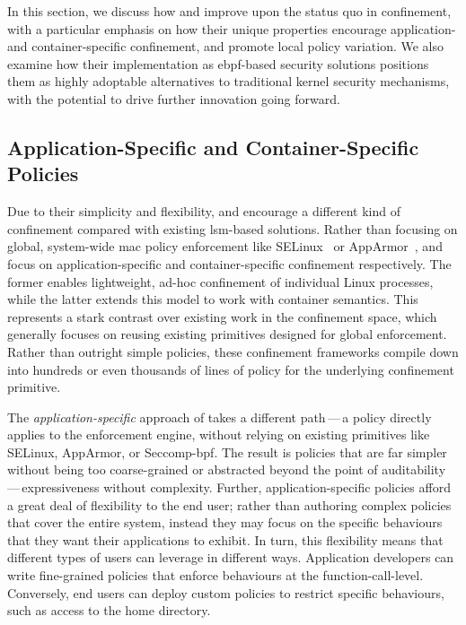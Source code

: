In this section, we discuss how \bpfbox{} and \bpfcontain{} improve upon the status quo in
confinement, with a particular emphasis on how their unique properties encourage
application- and container-specific confinement, and promote local policy variation. We
also examine how their implementation as \gls{ebpf}-based security solutions positions
them as highly adoptable alternatives to traditional kernel security mechanisms, with the
potential to drive further innovation going forward.

\subsection{Application-Specific and Container-Specific Policies}

Due to their simplicity and flexibility, \bpfbox{} and \bpfcontain{} encourage a different
kind of confinement compared with existing \gls{lsm}-based solutions. Rather than focusing
on global, system-wide \gls{mac} policy enforcement like
SELinux~\cite{smalley2001_selinux} or AppArmor~\cite{cowan2000_apparmor}, \bpfbox{} and
\bpfcontain{} focus on application-specific and container-specific confinement
respectively. The former enables lightweight, ad-hoc confinement of individual Linux
processes, while the latter extends this model to work with container semantics.  This
represents a stark contrast over existing work in the confinement space, which generally
focuses on reusing existing primitives designed for global enforcement.  Rather than
outright simple policies, these confinement frameworks compile down into hundreds or even
thousands of lines of policy for the underlying confinement primitive.

The \textit{application-specific} approach of \bpfbox{} takes a different path\,---\,a
\bpfbox{} policy directly applies to the \bpfbox{} enforcement engine, without relying on
existing primitives like SELinux, AppArmor, or Seccomp-bpf. The result is policies that
are far simpler without being too coarse-grained or abstracted beyond the point of
auditability\,---\,expressiveness without complexity. Further, application-specific
policies afford a great deal of flexibility to the end user; rather than authoring complex
policies that cover the entire system, instead they may focus on the specific behaviours
that they want their applications to exhibit. In turn, this flexibility means that
different types of users can leverage \bpfbox{} in different ways.  Application developers
can write fine-grained policies that enforce behaviours at the function-call-level.
Conversely, end users can deploy custom \bpfbox{} policies to restrict specific
behaviours, such as access to the home directory.

